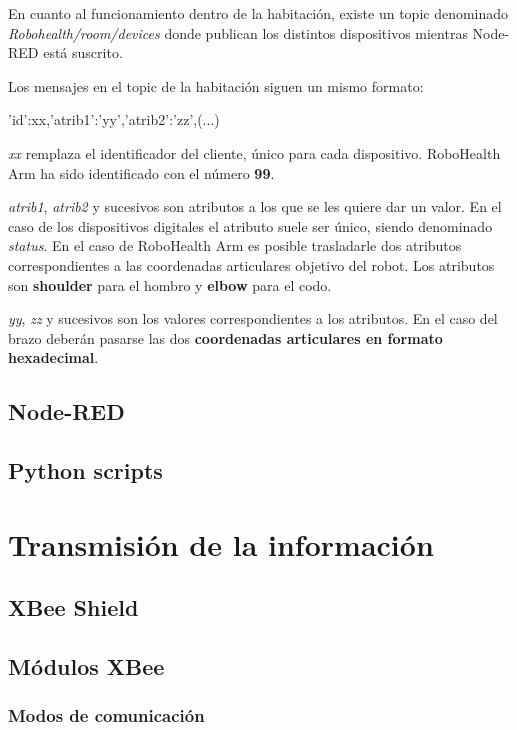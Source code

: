 En cuanto al funcionamiento dentro de la habitación, existe un topic denominado \textit{Robohealth/room/devices} donde publican los distintos dispositivos mientras Node-RED está suscrito.

Los mensajes en el topic de la habitación siguen un mismo formato:

{'id':xx,'atrib1':'yy','atrib2':'zz',(...)}

\textit{xx} remplaza el identificador del cliente, único para cada dispositivo. RoboHealth Arm ha sido identificado con el número \textbf{99}.

\textit{atrib1}, \textit{atrib2} y sucesivos son atributos a los que se les quiere dar un valor. En el caso de los dispositivos digitales el atributo suele ser único, siendo denominado \textit{status}. En el caso de RoboHealth Arm es posible trasladarle dos atributos correspondientes a las coordenadas articulares objetivo del robot. Los atributos son \textbf{shoulder} para el hombro y \textbf{elbow} para el codo.

\textit{yy}, \textit{zz} y sucesivos son los valores correspondientes a los atributos. En el caso del brazo deberán pasarse las dos \textbf{coordenadas articulares en formato hexadecimal}.

\subsection{Node-RED}



\subsection{Python scripts}


\section{Transmisión de la información}

\subsection{XBee Shield}

\subsection{Módulos XBee}

\subsubsection{Modos de comunicación}

